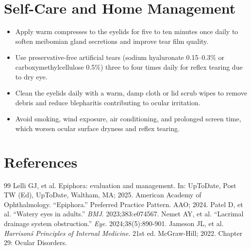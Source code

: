 \section*{Self-Care and Home Management}
\begin{itemize}
  \item Apply warm compresses to the eyelids for five to ten minutes once daily to soften meibomian gland secretions and improve tear film quality.
  \item Use preservative-free artificial tears (sodium hyaluronate 0.15--0.3\% or carboxymethylcellulose 0.5\%) three to four times daily for reflex tearing due to dry eye.
  \item Clean the eyelids daily with a warm, damp cloth or lid scrub wipes to remove debris and reduce blepharitis contributing to ocular irritation.
  \item Avoid smoking, wind exposure, air conditioning, and prolonged screen time, which worsen ocular surface dryness and reflex tearing.
\end{itemize}

\section*{References}
\begin{thebibliography}{99}
 Lelli GJ, et al. Epiphora: evaluation and management. In: UpToDate, Post TW (Ed), UpToDate, Waltham, MA; 2025.
 American Academy of Ophthalmology. ``Epiphora.'' Preferred Practice Pattern. AAO; 2024.
 Patel D, et al. ``Watery eyes in adults.'' \emph{BMJ}. 2023;383:e074567.
 Nemet AY, et al. ``Lacrimal drainage system obstruction.'' \emph{Eye}. 2024;38(5):890-901.
 Jameson JL, et al. \emph{Harrison\'s Principles of Internal Medicine}. 21st ed. McGraw-Hill; 2022. Chapter 29: Ocular Disorders.
\end{thebibliography}

